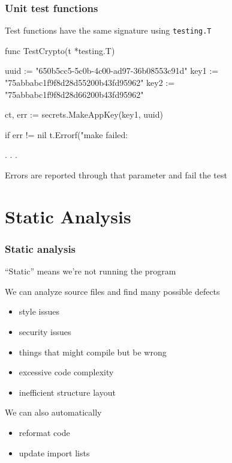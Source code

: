 \documentclass[handout,compress,t,11pt]{beamer}
\begin{document}
\begin{frame}[fragile]
    \frametitle{Unit test functions}
    Test functions have the same signature using \verb|testing.T| 
\begin{golang}

func TestCrypto(t *testing.T) {
	uuid := "650b5cc5-5c0b-4c00-ad97-36b08553c91d"
	key1 := "75abbabc1f9f8d28d55200b43fd95962"
	key2 := "75abbabc1f9f8d28d66200b43fd95962"

	ct, err := secrets.MakeAppKey(key1, uuid)

	if err != nil {
		t.Errorf("make failed: %
	}
    
    . . .
}
\end{golang}
    \vspace{0.4\baselineskip}
    Errors are reported through that parameter and fail the test
\end{frame}



\section{Static Analysis}

\begin{frame}[fragile]
    \frametitle{Static analysis}
    ``Static'' means we're not running the program \par
    \vspace{0.4\baselineskip}
    We can analyze source files and find many possible defects
    \begin{itemize}
        \item style issues
        \item security issues
        \item things that might compile but be wrong
        \item excessive code complexity
        \item inefficient structure layout
    \end{itemize}
    \vspace{\baselineskip}
    We can also automatically 
    \begin{itemize}
        \item reformat code
        \item update import lists
    \end{itemize}
\end{frame}
\end{document}
